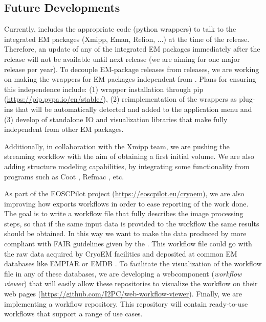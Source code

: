 \subsection{Future Developments}

Currently, \scipion includes the appropriate code (python wrappers) to talk to the integrated EM packages (Xmipp, Eman, Relion, ...) at the time of the release. Therefore, an update of any of the integrated EM packages immediately after the \scipion release will not be available until next \scipion release (we are aiming for one major release per year). To decouple EM-package releases from \scipion releases, we are working on making the wrappers for EM packages  independent from \scipion. Plans for ensuring this independence include: (1) wrapper installation through pip (\url{https://pip.pypa.io/en/stable/}), (2) reimplementation of the wrappers as plug-ins that will be automatically detected and added to the application menu and (3) develop of standalone IO  and visualization libraries that make \scipion fully independent from other EM packages.

Additionally, in collaboration with the Xmipp team, we are pushing the streaming workflow with the aim of obtaining a first initial volume. We are also adding structure modeling capabilities, by integrating some functionality from programs such as Coot \citep{emsley2010:coot}, Refmac \citep{Murshudov1997:refmac}, etc. 

As part of the EOSCPilot project (\url{https://eoscpilot.eu/cryoem}), we are also improving  how \scipion exports workflows in order to ease reporting of the work done. The goal is to write a workflow file that fully describes the image processing steps, so that if the same input data is provided to the workflow the same results should be obtained. In this way we want to make  the data produced by \scipion more compliant with FAIR guidelines given by the \citet{eu2016:fair}. This workflow file could go with the raw data acquired by CryoEM facilities and deposited at common EM databases like EMPIAR or EMDB \citep{Patwardhan2016:databasesEM}. To facilitate the visualization of the workflow file in any of these databases, we are  developing a  webcomponent (\scipion \emph{workflow viewer}) that will easily allow these repositories to visualize the workflow on their web pages (\url{https://github.com/I2PC/web-workflow-viewer}). Finally, we are implementing a workflow repository. This repository will contain ready-to-use workflows that support a range of use cases.
